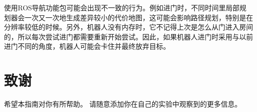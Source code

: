 \begin{enumerate}
	使用ROS导航功能包可能会出现不一致的行为。例如进门时，不同时间里局部规划器会一次又一次地生成差异较小的代价地图，这可能会影响路径规划，特别是在分辨率较低的时候。另外，机器人没有内存时，它不记得上次是怎么从门进入房间的，所以每次尝试进门都需要重新开始尝试。因此，如果机器人进门时采用与以前进门不同的角度，机器人可能会卡住并最终放弃目标。
	
\end{enumerate}


\section*{致谢}

希望本指南对你有所帮助。 请随意添加你在自己的实验中观察到的更多信息。

